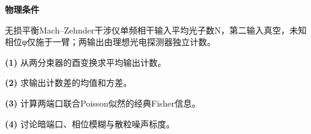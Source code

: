 \textbf{物理条件}\par 无损平衡Mach–Zehnder干涉仪单频相干输入平均光子数N，第二输入真空，未知相位φ仅施于一臂；两输出由理想光电探测器独立计数。
\par\noindent\textbf{(1)} 从两分束器的酉变换求平均输出计数。
\par\noindent\textbf{(2)} 求输出计数差的均值和方差。
\par\noindent\textbf{(3)} 计算两端口联合Poisson似然的经典Fisher信息。
\par\noindent\textbf{(4)} 讨论暗端口、相位模糊与散粒噪声标度。

